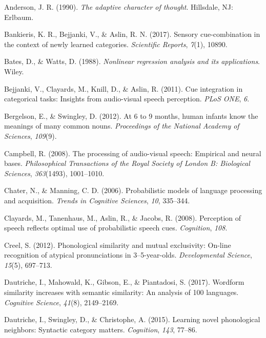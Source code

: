 \documentclass[english,floatsintext,man]{apa6}
\theoremstyle{definition}
\theoremstyle{definition}
\theoremstyle{definition}
\theoremstyle{remark}
\begin{document}
\hypertarget{refs}{}
\hypertarget{ref-anderson90}{}
Anderson, J. R. (1990). \emph{The adaptive character of thought}.
Hillsdale, NJ: Erlbaum.

\hypertarget{ref-Bankieris17}{}
Bankieris, K. R., Bejjanki, V., \& Aslin, R. N. (2017). Sensory
cue-combination in the context of newly learned categories.
\emph{Scientific Reports}, \emph{7}(1), 10890.

\hypertarget{ref-bates88}{}
Bates, D., \& Watts, D. (1988). \emph{Nonlinear regression analysis and
its applications}. Wiley.

\hypertarget{ref-bejjanki2011}{}
Bejjanki, V., Clayards, M., Knill, D., \& Aslin, R. (2011). Cue
integration in categorical tasks: Insights from audio-visual speech
perception. \emph{PLoS ONE}, \emph{6}.

\hypertarget{ref-bergelson2012}{}
Bergelson, E., \& Swingley, D. (2012). At 6 to 9 months, human infants
know the meanings of many common nouns. \emph{Proceedings of the
National Academy of Sciences}, \emph{109}(9).

\hypertarget{ref-Campbell2008}{}
Campbell, R. (2008). The processing of audio-visual speech: Empirical
and neural bases. \emph{Philosophical Transactions of the Royal Society
of London B: Biological Sciences}, \emph{363}(1493), 1001--1010.

\hypertarget{ref-chater06}{}
Chater, N., \& Manning, C. D. (2006). Probabilistic models of language
processing and acquisition. \emph{Trends in Cognitive Sciences},
\emph{10}, 335--344.

\hypertarget{ref-clayard08}{}
Clayards, M., Tanenhaus, M., Aslin, R., \& Jacobs, R. (2008). Perception
of speech reflects optimal use of probabilistic speech cues.
\emph{Cognition}, \emph{108}.

\hypertarget{ref-Creel2012}{}
Creel, S. (2012). Phonological similarity and mutual exclusivity:
On-line recognition of atypical pronunciations in 3--5-year-olds.
\emph{Developmental Science}, \emph{15}(5), 697--713.

\hypertarget{ref-dautriche17}{}
Dautriche, I., Mahowald, K., Gibson, E., \& Piantadosi, S. (2017).
Wordform similarity increases with semantic similarity: An analysis of
100 languages. \emph{Cognitive Science}, \emph{41}(8), 2149--2169.

\hypertarget{ref-dautriche2015}{}
Dautriche, I., Swingley, D., \& Christophe, A. (2015). Learning novel
phonological neighbors: Syntactic category matters. \emph{Cognition},
\emph{143}, 77--86.
\end{document}
